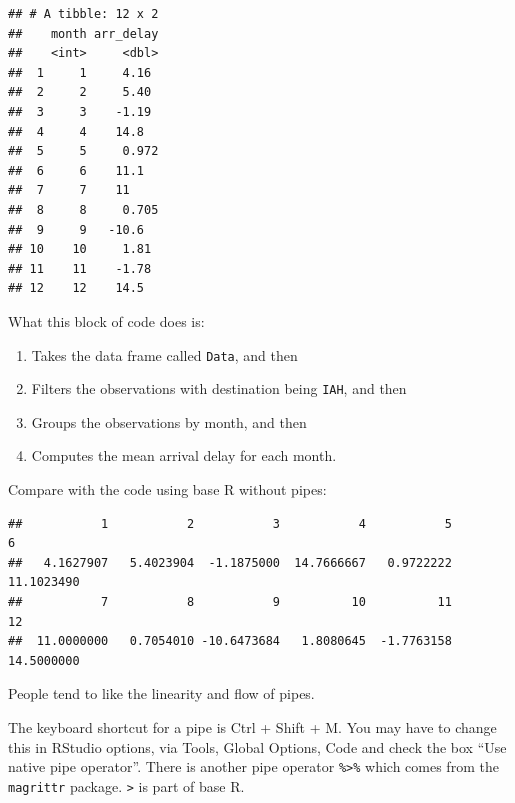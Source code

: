 \documentclass[
]{book}
\newenvironment{Shaded}{\begin{snugshade}}{\end{snugshade}}
\newcommand{\AttributeTok}[1]{\textcolor[rgb]{0.13,0.29,0.53}{#1}}
\newcommand{\ConstantTok}[1]{\textcolor[rgb]{0.56,0.35,0.01}{#1}}
\newcommand{\FunctionTok}[1]{\textcolor[rgb]{0.13,0.29,0.53}{\textbf{#1}}}
\newcommand{\NormalTok}[1]{#1}
\newcommand{\SpecialCharTok}[1]{\textcolor[rgb]{0.81,0.36,0.00}{\textbf{#1}}}
\newcommand{\StringTok}[1]{\textcolor[rgb]{0.31,0.60,0.02}{#1}}
\providecommand{\tightlist}{%
  \setlength{\itemsep}{0pt}\setlength{\parskip}{0pt}}
\theoremstyle{definition}
\theoremstyle{definition}
\theoremstyle{definition}
\theoremstyle{definition}
\theoremstyle{remark}
\begin{document}
\begin{verbatim}
## # A tibble: 12 x 2
##    month arr_delay
##    <int>     <dbl>
##  1     1     4.16 
##  2     2     5.40 
##  3     3    -1.19 
##  4     4    14.8  
##  5     5     0.972
##  6     6    11.1  
##  7     7    11    
##  8     8     0.705
##  9     9   -10.6  
## 10    10     1.81 
## 11    11    -1.78 
## 12    12    14.5
\end{verbatim}

What this block of code does is:

\begin{enumerate}
\def\labelenumi{\arabic{enumi}.}
\tightlist
\item
  Takes the data frame called \texttt{Data}, and then
\item
  Filters the observations with destination being \texttt{IAH}, and then
\item
  Groups the observations by month, and then
\item
  Computes the mean arrival delay for each month.
\end{enumerate}

Compare with the code using base R without pipes:

\begin{Shaded}
\end{Shaded}

\begin{verbatim}
##           1           2           3           4           5           6 
##   4.1627907   5.4023904  -1.1875000  14.7666667   0.9722222  11.1023490 
##           7           8           9          10          11          12 
##  11.0000000   0.7054010 -10.6473684   1.8080645  -1.7763158  14.5000000
\end{verbatim}

People tend to like the linearity and flow of pipes.

The keyboard shortcut for a pipe is Ctrl + Shift + M. You may have to change this in RStudio options, via Tools, Global Options, Code and check the box ``Use native pipe operator''. There is another pipe operator \texttt{\%\textgreater{}\%} which comes from the \texttt{magrittr} package. \texttt{\textbar{}\textgreater{}} is part of base R.
\end{document}
